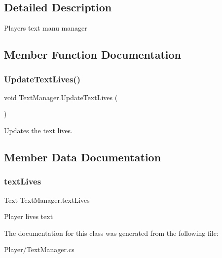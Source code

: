 \subsection{Detailed Description}
Player\textquotesingle{}s text manu manager 



\subsection{Member Function Documentation}
\mbox{\label{class_text_manager_a3bbadf652b27afb331e85866cc2b46d4}} 
\subsubsection{\texorpdfstring{Update\+Text\+Lives()}{UpdateTextLives()}}
{\footnotesize\ttfamily void Text\+Manager.\+Update\+Text\+Lives (\begin{DoxyParamCaption}{ }\end{DoxyParamCaption})}



Updates the text lives. 



\subsection{Member Data Documentation}
\mbox{\label{class_text_manager_a8b12b74376f0b32cbef62f6b041e25f4}} 
\subsubsection{\texorpdfstring{text\+Lives}{textLives}}
{\footnotesize\ttfamily Text Text\+Manager.\+text\+Lives}



Player lives text 



The documentation for this class was generated from the following file\+:\begin{DoxyCompactItemize}
\item 
Player/Text\+Manager.\+cs\end{DoxyCompactItemize}
